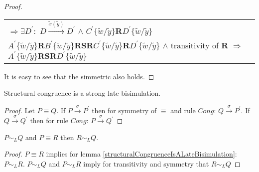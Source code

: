 \begin{proposition}
\begin{proof}
\begin{center}
\begin{tabular}{l}
	$\Rightarrow \exists D^{'}:$ $D \xrightarrow{\tilde{x}(\tilde{y})} D^{'}$ $\wedge$ $C^{'}\{\tilde{w}/\tilde{y}\} \mathbf{R} D^{'}\{\tilde{w}/\tilde{y}\}$
       \\
	$A^{'}\{\tilde{w}/\tilde{y}\} \mathbf{R} B^{'}\{\tilde{w}/\tilde{y}\} \mathbf{R} \mathbf{S} \mathbf{R} C^{'}\{\tilde{w}/\tilde{y}\} \mathbf{R} D^{'}\{\tilde{w}/\tilde{y}\}$ $\wedge$ transitivity of $\mathbf{R}$
	$\Rightarrow$ $A^{'}\{\tilde{w}/\tilde{y}\} \mathbf{R} \mathbf{S} \mathbf{R} D^{'}\{\tilde{w}/\tilde{y}\}$
      \end{tabular}
    \end{center}
    It is easy to see that the simmetric also holds.
   \end{proof}
\end{proposition}

\begin{lemma}\label{structuralCongruenceIsALateBisimulation}
  Structural congruence is a strong late bisimulation.
  \begin{proof}
    Let $P\equiv Q$. If $P\xrightarrow{\sigma}P^{'}$ then for symmetry of $\equiv$ and rule $Cong$: $Q\xrightarrow{\sigma}P^{'}$. If $Q\xrightarrow{\sigma}Q^{'}$ then for rule $Cong$: $P\xrightarrow{\sigma}Q^{'}$
  \end{proof}
\end{lemma}


\begin{lemma}
  $P \sim_{L} Q$ and $P \equiv R$ then $R \sim_{L} Q$.
  \begin{proof}
    $P\equiv R$ implies for lemma \ref{structuralCongruenceIsALateBisimulation}: $P \sim_{L} R$. $P \sim_{L} Q$ and $P \sim_{L} R$ imply for transitivity and symmetry that $R\sim_{L}Q$
  \end{proof}
\end{lemma}

